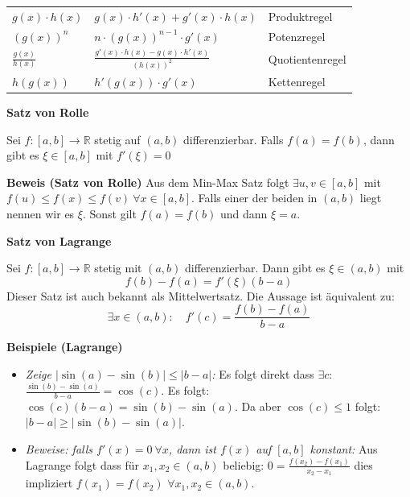 \documentclass[25pt]{sciposter}
\newcommand{\R}{\mathbb{R}}
\newenvironment{method}[1]{\begin{mdframed}[backgroundcolor=blue!10,innertopmargin=15pt, innerbottommargin=15pt, nobreak=true]
		\textbf{#1 }
	}
	{ 
	\end{mdframed}
}
\begin{document}
\begin{multicols}{3}
{\begin{table}[]
\begin{tabular}{@{} p{} p{} p{} @{}}
		  \midrule
		  $g(x) \cdot h(x)$ & $g(x) \cdot h'(x) + g'(x) \cdot h(x)$ & Produktregel\\
		  $\left(g(x)\right)^n$ & $n \cdot \left( g(x) \right)^{n-1} \cdot g'(x)$ & Potenzregel\\
		  $\frac{g(x)}{h(x)}$ & $\frac{ g'(x) \cdot h(x) - g(x)\cdot h'(x)}{\left(h(x)\right) ^2}$ & Quotientenregel\\
		  $h(g(x))$ & $h'(g(x)) \cdot g'(x)$ & Kettenregel\\
		  \bottomrule
	\end{tabular}
\end{table}
}




\begin{method}{Satz von Rolle}
	Sei $f: [a,b] \to \R$ stetig auf $(a,b)$ differenzierbar. Falls $f(a) = f(b)$, dann gibt es $\xi \in [a,b]$ mit $f'(\xi) = 0$
\end{method}
\textbf{Beweis (Satz von Rolle)} Aus dem Min-Max Satz folgt $\exists u,v \in [a,b]$ mit $f(u) \leq f(x) \leq f(v) \ \forall x \in [a,b]$. Falls einer der beiden in $(a,b)$ liegt nennen wir es $\xi$. Sonst gilt $f(a) = f(b)$ und dann $\xi = a$.


\begin{method}{Satz von Lagrange}
	Sei $f:[a,b] \to \R$ stetig mit $(a,b)$ differenzierbar. Dann gibt es $\xi \in (a,b)$ mit $$f(b) - f(a) = f'(\xi) (b-a)$$
	Dieser Satz ist auch bekannt als Mittelwertsatz. Die Aussage ist äquivalent zu: 
	$$\exists x \in (a,b) : \quad f'(c) = \frac{f(b) -f(a) }{b-a}$$
\end{method}
\textbf{Beispiele (Lagrange)}
\begin{itemize}
	\item \textit{Zeige $|\sin(a) - \sin(b)| \leq |b-a|$:} Es folgt direkt dass $\exists c$: $\frac{\sin(b)- \sin(a)}{b-a} = \cos(c)$. Es folgt: $\cos(c) (b-a) = \sin(b) - \sin(a)$. Da aber $\cos(c) \leq 1$ folgt:
	$|b-a| \geq |\sin(b) - \sin(a)|$.
	\item \textit{Beweise: falls $f'(x) = 0 \ \forall x$, dann ist $f(x)$ auf $[a,b]$ konstant:} Aus Lagrange folgt dass für $x_1,x_2\in (a,b)$ beliebig: $0 = \frac{f(x_2)-f(x_1)}{x_2-x_1}$ dies impliziert $f(x_1) = f(x_2)$ $\forall x_1,x_2 \in (a,b)$.
\end{itemize}




\end{multicols}
\end{document}
